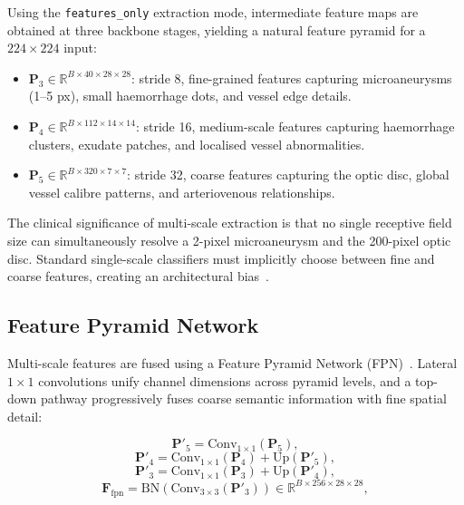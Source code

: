 \documentclass[review,12pt]{elsarticle}
\begin{document}
Using the \texttt{features\_only} extraction mode, intermediate feature maps
are obtained at three backbone stages, yielding a natural feature pyramid for
a $224 \times 224$ input:

\begin{itemize}
  \item $\mathbf{P}_3 \in \mathbb{R}^{B \times 40 \times 28 \times 28}$:
  stride 8, fine-grained features capturing microaneurysms (1--5 px), small
  haemorrhage dots, and vessel edge details.
  \item $\mathbf{P}_4 \in \mathbb{R}^{B \times 112 \times 14 \times 14}$:
  stride 16, medium-scale features capturing haemorrhage clusters, exudate
  patches, and localised vessel abnormalities.
  \item $\mathbf{P}_5 \in \mathbb{R}^{B \times 320 \times 7 \times 7}$:
  stride 32, coarse features capturing the optic disc, global vessel
  calibre patterns, and arteriovenous relationships.
\end{itemize}

The clinical significance of multi-scale extraction is that no single
receptive field size can simultaneously resolve a 2-pixel microaneurysm and
the 200-pixel optic disc. Standard single-scale classifiers must implicitly
choose between fine and coarse features, creating an architectural
bias~\cite{lin2017fpn}.

\subsection{Feature Pyramid Network}

Multi-scale features are fused using a Feature Pyramid Network
(FPN)~\cite{lin2017fpn}. Lateral $1 \times 1$ convolutions unify channel
dimensions across pyramid levels, and a top-down pathway progressively
fuses coarse semantic information with fine spatial detail:

\begin{equation}
  \mathbf{P}'_5 = \text{Conv}_{1\times1}(\mathbf{P}_5),
  \label{eq:fpn1}
\end{equation}
\begin{equation}
  \mathbf{P}'_4 = \text{Conv}_{1\times1}(\mathbf{P}_4) +
  \text{Up}(\mathbf{P}'_5),
  \label{eq:fpn2}
\end{equation}
\begin{equation}
  \mathbf{P}'_3 = \text{Conv}_{1\times1}(\mathbf{P}_3) +
  \text{Up}(\mathbf{P}'_4),
  \label{eq:fpn3}
\end{equation}
\begin{equation}
  \mathbf{F}_{\text{fpn}} = \text{BN}\!\left(\text{Conv}_{3\times3}(\mathbf{P}'_3)\right)
  \in \mathbb{R}^{B \times 256 \times 28 \times 28},
  \label{eq:fpn4}
\end{equation}
\end{document}
